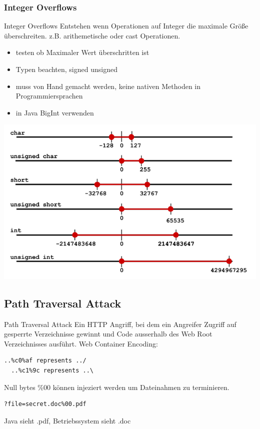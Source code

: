 \documentclass[10pt]{beamer}
\begin{document}
\subsubsection{Integer Overflows}

\begin{frame}[fragile]{Integer Overflows}
  Entstehen wenn Operationen auf Integer die maximale Gr\"o{\ss}e \"uberschreiten. z.B. arithemetische oder cast Operationen.
  \begin{itemize}
    \item testen ob Maximaler Wert \"uberschritten ist
    \item Typen beachten, signed unsigned
    \item muss von Hand gemacht werden, keine nativen Methoden in Programmiersprachen
    \item in Java BigInt verwenden
  \end{itemize}
  \includegraphics[scale=0.25]{integer_overflow}
\end{frame}



\subsection{Path Traversal Attack}

\begin{frame}[fragile]{Path Traversal Attack}
  Ein HTTP Angriff, bei dem ein Angreifer Zugriff auf gesperrte Verzeichnisse gewinnt und Code ausserhalb des Web Root Verzeichnisses ausf\"uhrt.
  \newline
  \newline
  Web Container Encoding:
  \begin{lstlisting}[style=BashStyle]
  ..%c0%af represents ../
  ..%c1%9c represents ..\
  \end{lstlisting}

  Null bytes \%00 k\"onnen injeziert werden um Dateinahmen zu terminieren.
  \begin{lstlisting}[style=BashStyle]
  ?file=secret.doc%00.pdf
  \end{lstlisting}
  Java sieht .pdf, Betriebssystem sieht .doc
\end{frame}
\end{document}
